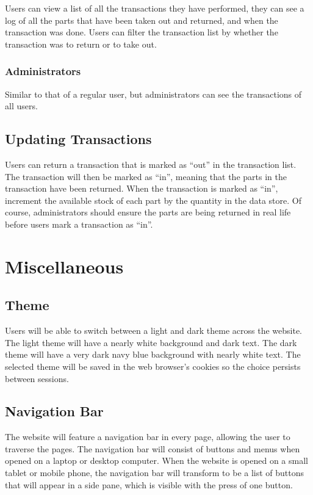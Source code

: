 \documentclass[12pt, letterpaper]{article}
\begin{document}
Users can view a list of all the transactions they have performed, they can see a log of all the parts that have been taken out and returned, and when the transaction was done. Users can filter the transaction list by whether the transaction was to return or to take out.

\subsubsection{Administrators}

Similar to that of a regular user, but administrators can see the transactions of all users.

\subsection{Updating Transactions}

Users can return a transaction that is marked as ``out'' in the transaction list. The transaction will then be marked as ``in'', meaning that the parts in the transaction have been returned. When the transaction is marked as ``in'', increment the available stock of each part by the quantity in the data store. Of course, administrators should ensure the parts are being returned in real life before users mark a transaction as ``in''.

\section{Miscellaneous}

\subsection{Theme}
Users will be able to switch between a light and dark theme across the website. The light theme will have a nearly white background and dark text. The dark theme will have a very dark navy blue background with nearly white text. The selected theme will be saved in the web browser's cookies so the choice persists between sessions.

\subsection{Navigation Bar}
The website will feature a navigation bar in every page, allowing the user to traverse the pages. The navigation bar will consist of buttons and menus when opened on a laptop or desktop computer. When the website is opened on a small tablet or mobile phone, the navigation bar will transform to be a list of buttons that will appear in a side pane, which is visible with the press of one button.
\end{document}
